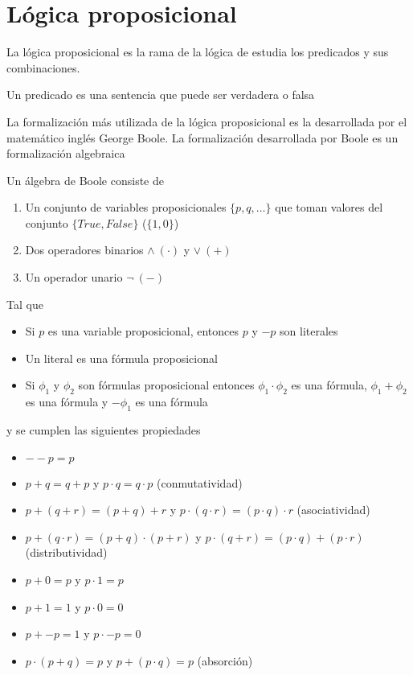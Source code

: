 
\newcommand{\disj}[1]{\ensuremath{[#1]}}
\newcommand{\conj}[1]{\ensuremath{\{#1\}}}

\section{Lógica proposicional}
La lógica proposicional es la rama de la lógica de estudia los predicados y sus combinaciones.
\begin{definition}
 Un predicado es una sentencia que puede ser verdadera o falsa
\end{definition}

La formalización más utilizada de la lógica proposicional es la desarrollada
por el matemático inglés George Boole.  La formalización desarrollada por
Boole es un formalización algebraica

\begin{definition}
 Un álgebra de Boole consiste de 
	\begin{enumerate}
		\item Un conjunto de variables proposicionales $\{p, q, \ldots\}$ que toman valores del conjunto $\{True, False\}$ ($\{1, 0\}$)
		\item Dos operadores binarios $\wedge\ (\cdot)$  y $\vee\ (+)$
		\item Un operador unario $\neg\ (-)$
	\end{enumerate}
	Tal que 
	\begin{itemize}
		\item Si $p$ es una variable proposicional, entonces $p$ y $-p$ son literales
		\item Un literal es una fórmula proposicional
		\item Si $\phi_1$ y $\phi_2$ son fórmulas proposicional entonces $\phi_1 \cdot \phi_2$ es una fórmula, $\phi_1 + \phi_2$ es una fórmula y $-\phi_1$ es una fórmula
	\end{itemize}
	y se cumplen las siguientes propiedades
	\begin{itemize}
		\item $--p = p$
		\item $p + q = q + p$ y $p \cdot q = q \cdot p$ (conmutatividad)
		\item $p + (q + r) = (p + q) + r$ y $p \cdot (q \cdot r) = (p \cdot q) \cdot r$ (asociatividad)
		\item $p + (q \cdot r) = (p + q) \cdot (p + r)$ y $p \cdot (q + r) = (p \cdot q) + (p \cdot r)$ (distributividad)
		\item $p + 0 = p$ y $p \cdot 1 = p$ 
		\item $p + 1 = 1$ y $p \cdot 0 = 0$
		\item $p + -p = 1$ y $p \cdot -p = 0$
		\item $p \cdot (p + q) = p$ y $p + (p \cdot q) = p$ (absorción)
	\end{itemize}
\end{definition}

